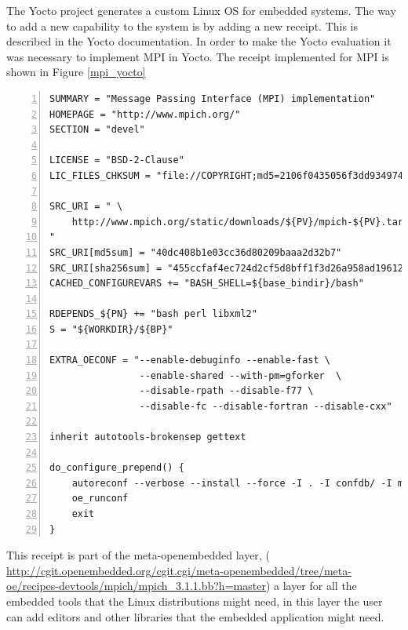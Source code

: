 The Yocto project \cite{yocto-project} generates a custom Linux OS for
embedded systems. The way to add a new capability to the system is by adding a
new receipt. This is described in the Yocto documentation. In order to make the
Yocto evaluation it was necessary to implement MPI in Yocto. The receipt
implemented for MPI is shown in Figure \ref{mpi_yocto}

\begin{minipage}{\textwidth}
\end{minipage}

\begin{minipage}{\textwidth}

\begin{lstlisting}[frame=single,numbers=left,breaklines=true]
SUMMARY = "Message Passing Interface (MPI) implementation"
HOMEPAGE = "http://www.mpich.org/"
SECTION = "devel"

LICENSE = "BSD-2-Clause"
LIC_FILES_CHKSUM = "file://COPYRIGHT;md5=2106f0435056f3dd9349747a766e5816"

SRC_URI = " \
	http://www.mpich.org/static/downloads/${PV}/mpich-${PV}.tar.gz \
"
SRC_URI[md5sum] = "40dc408b1e03cc36d80209baaa2d32b7"
SRC_URI[sha256sum] = "455ccfaf4ec724d2cf5d8bff1f3d26a958ad196121e7ea26504fd3018757652d"
CACHED_CONFIGUREVARS += "BASH_SHELL=${base_bindir}/bash"

RDEPENDS_${PN} += "bash perl libxml2"
S = "${WORKDIR}/${BP}"

EXTRA_OECONF = "--enable-debuginfo --enable-fast \
                --enable-shared --with-pm=gforker  \
		        --disable-rpath --disable-f77 \
                --disable-fc --disable-fortran --disable-cxx"

inherit autotools-brokensep gettext

do_configure_prepend() {
    autoreconf --verbose --install --force -I . -I confdb/ -I maint/
    oe_runconf
    exit
}

\end{lstlisting}
\label{mpi_yocto} 
\end{minipage}

\newpage

This receipt is part of the meta-openembedded layer, (
\url{http://cgit.openembedded.org/cgit.cgi/meta-openembedded/tree/meta-oe/recipes-devtools/mpich/mpich_3.1.1.bb?h=master})
a layer for all the embedded tools that the Linux distributions might need, in this
layer the user can add editors and other libraries that the embedded
application might need.

